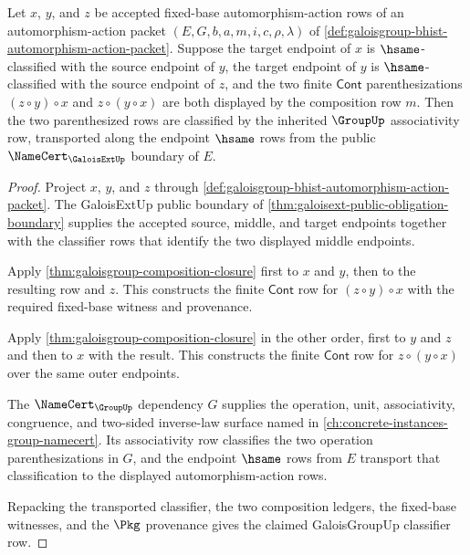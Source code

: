 \begin{theorem}
\label{thm:galoisgroup-composition-associativity-row}
Let $x$, $y$, and $z$ be accepted fixed-base automorphism-action rows of an
automorphism-action packet
$(E,G,b,a,m,i,c,\rho,\lambda)$ of
\autoref{def:galoisgroup-bhist-automorphism-action-packet}. Suppose the target
endpoint of $x$ is $\hsame$-classified with the source endpoint of $y$, the
target endpoint of $y$ is $\hsame$-classified with the source endpoint of $z$,
and the two finite $\mathsf{Cont}$ parenthesizations
$(z\circ y)\circ x$ and $z\circ(y\circ x)$ are both displayed by the composition
row $m$. Then the two parenthesized rows are classified by the inherited
$\GroupUp$ associativity row, transported along the endpoint $\hsame$ rows from
the public $\NameCert_{\GaloisExtUp}$ boundary of $E$.
\end{theorem}
\begin{proof}
Project $x$, $y$, and $z$ through
\autoref{def:galoisgroup-bhist-automorphism-action-packet}. The GaloisExtUp
public boundary of \autoref{thm:galoisext-public-obligation-boundary} supplies
the accepted source, middle, and target endpoints together with the classifier
rows that identify the two displayed middle endpoints.

Apply \autoref{thm:galoisgroup-composition-closure} first to $x$ and $y$, then
to the resulting row and $z$. This constructs the finite $\mathsf{Cont}$ row for
$(z\circ y)\circ x$ with the required fixed-base witness and provenance.

Apply \autoref{thm:galoisgroup-composition-closure} in the other order, first
to $y$ and $z$ and then to $x$ with the result. This constructs the finite
$\mathsf{Cont}$ row for $z\circ(y\circ x)$ over the same outer endpoints.

The $\NameCert_{\GroupUp}$ dependency $G$ supplies the operation, unit,
associativity, congruence, and two-sided inverse-law surface named in
\autoref{ch:concrete-instances-group-namecert}. Its associativity row
classifies the two operation parenthesizations in $G$, and the endpoint
$\hsame$ rows from $E$ transport that classification to the displayed
automorphism-action rows.

Repacking the transported classifier, the two composition ledgers, the
fixed-base witnesses, and the $\Pkg$ provenance gives the claimed
GaloisGroupUp classifier row.
\end{proof}

